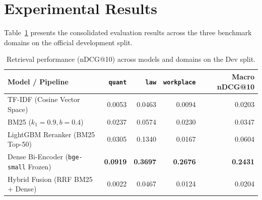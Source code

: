 \section{Experimental Results}
\label{sec:results}

Table~\ref{tab:results} presents the consolidated evaluation results across the three benchmark domains on the official development split.

\begin{table}[h]
\centering
\small
\caption{Retrieval performance (nDCG@10) across models and domains on the Dev split.}
\label{tab:results}
\begin{tabular}{lrrrr}
\toprule
\textbf{Model / Pipeline} & \textbf{\texttt{quant}} & \textbf{\texttt{law}} & \textbf{\texttt{workplace}} & \textbf{Macro nDCG@10} \\
\midrule
TF-IDF (Cosine Vector Space) & 0.0053 & 0.0463 & 0.0094 & 0.0203 \\
BM25 ($k_1=0.9, b=0.4$) & 0.0237 & 0.0574 & 0.0230 & 0.0347 \\
LightGBM Reranker (BM25 Top-50) & 0.0305 & 0.1340 & 0.0167 & 0.0604 \\
\midrule
Dense Bi-Encoder (\texttt{bge-small} Frozen) & \textbf{0.0919} & \textbf{0.3697} & \textbf{0.2676} & \textbf{0.2431} \\
Hybrid Fusion (RRF BM25 + Dense) & 0.0022 & 0.0467 & 0.0124 & 0.0204 \\
\bottomrule
\end{tabular}
\end{table}

